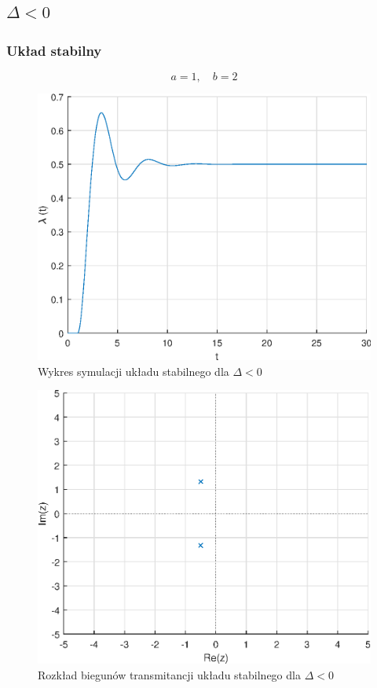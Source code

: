 \documentclass[a4paper]{article}
\begin{document}
\subsection{$\Delta < 0$}
\subsubsection{Układ stabilny}
$$
a=1,\quad b=2
$$
\begin{figure}[H]
    \centering
    \includegraphics[scale=0.6]{c1.eps}
    \caption{Wykres symulacji układu stabilnego dla $\Delta<0$}
\end{figure}
\begin{figure}[H]
    \centering
    \includegraphics[scale=0.6]{c1_z.eps}
    \caption{Rozkład biegunów transmitancji układu stabilnego dla $\Delta<0$}
\end{figure}
\end{document}

